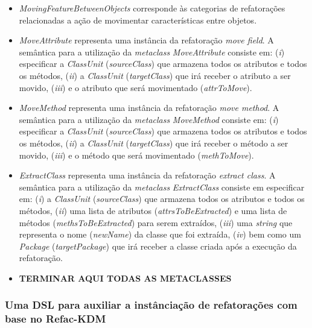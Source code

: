 \begin{itemize}
\item \textit{MovingFeatureBetweenObjects} corresponde às categorias de refatorações relacionadas a ação de movimentar características entre objetos.

\item \textit{MoveAttribute} representa uma instância da refatoração \textit{move field}. A semântica para a utilização da \textit{metaclass} \textit{MoveAttribute} consiste em: (\textit{i}) especificar a \textit{ClassUnit} (\textit{sourceClass}) que armazena todos os atributos e todos os métodos, (\textit{ii}) a \textit{ClassUnit} (\textit{targetClass}) que irá receber o atributo a ser movido, (\textit{iii}) e o atributo que será movimentado (\textit{attrToMove}).  

\item \textit{MoveMethod} representa uma instância da refatoração \textit{move method}. A semântica para a utilização da \textit{metaclass} \textit{MoveMethod} consiste em: (\textit{i}) especificar a \textit{ClassUnit} (\textit{sourceClass}) que armazena todos os atributos e todos os métodos, (\textit{ii}) a \textit{ClassUnit} (\textit{targetClass}) que irá receber o método a ser movido, (\textit{iii}) e o método que será movimentado (\textit{methToMove}).

\item \textit{ExtractClass} representa uma instância da refatoração \textit{extract class}. A semântica para a utilização da \textit{metaclass} \textit{ExtractClass} consiste em especificar em: (\textit{i}) a \textit{ClassUnit} (\textit{sourceClass}) que armazena todos os atributos e todos os métodos, (\textit{ii}) uma lista de atributos (\textit{attrsToBeExtracted}) e uma lista de métodos (\textit{methsToBeExtracted}) para serem extraídos, (\textit{iii}) uma \textit{string} que representa o nome (\textit{newName}) da classe que foi extraída, (\textit{iv}) bem como um \textit{Package} (\textit{targetPackage}) que irá receber a classe criada após a execução da refatoração.

\item \textbf{TERMINAR AQUI TODAS AS METACLASSES}

\end{itemize} 

\subsubsection{Uma DSL para auxiliar a instânciação de refatorações com base no Refac-KDM}

